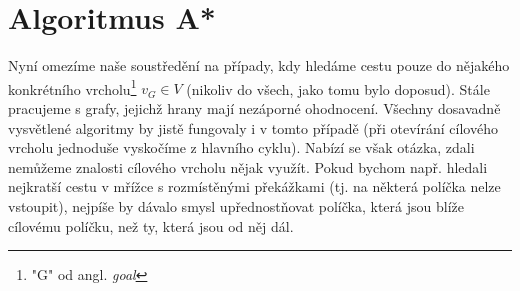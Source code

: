 \section{Algoritmus A*}\label{sec:astar}

Nyní omezíme naše soustředění na případy, kdy hledáme cestu pouze do nějakého konkrétního vrcholu\footnote{"G" od angl. \emph{goal}} $v_G\in V$ (nikoliv do všech, jako tomu bylo doposud). Stále pracujeme s grafy, jejichž hrany mají nezáporné ohodnocení. Všechny dosavadně vysvětlené algoritmy by jistě fungovaly i v tomto případě (při otevírání cílového vrcholu jednoduše vyskočíme z hlavního cyklu). Nabízí se však otázka, zdali nemůžeme znalosti cílového vrcholu nějak využít. Pokud bychom např. hledali nejkratší cestu v mřížce s rozmístěnými překážkami (tj. na některá políčka nelze vstoupit), nejpíše by dávalo smysl upřednostňovat políčka, která jsou blíže cílovému políčku, než ty, která jsou od něj dál.


